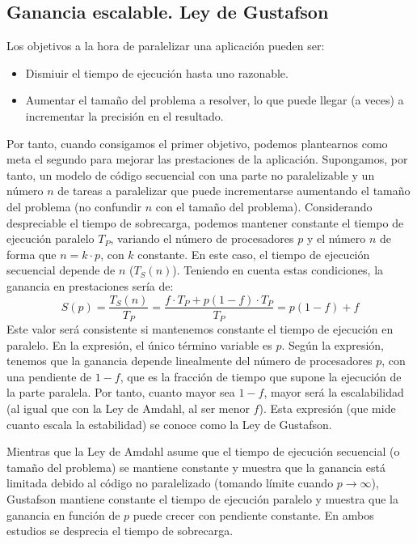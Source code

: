 \subsection{Ganancia escalable. Ley de Gustafson}
Los objetivos a la hora de paralelizar una aplicación pueden ser:
\begin{itemize}
    \item Dismiuir el tiempo de ejecución hasta uno razonable.
    \item Aumentar el tamaño del problema a resolver, lo que puede llegar (a veces) a incrementar la precisión en el resultado.
\end{itemize}

Por tanto, cuando consigamos el primer objetivo, podemos plantearnos como meta el segundo para mejorar las prestaciones de la aplicación. Supongamos, por tanto, un modelo de código secuencial con una parte no paralelizable y un número $n$ de tareas a paralelizar que puede incrementarse aumentando el tamaño del problema (no confundir $n$ con el tamaño del problema). Considerando despreciable el tiempo de sobrecarga, podemos mantener constante el tiempo de ejecución paralelo $T_P$, variando el número de procesadores $p$ y el número $n$ de forma que $n=k\cdot p$, con $k$ constante. En este caso, el tiempo de ejecución secuencial depende de $n$ ($T_S(n)$). Teniendo en cuenta estas condiciones, la ganancia en prestaciones sería de:
\begin{equation}
    S(p) = \dfrac{T_S(n)}{T_P} = \dfrac{f\cdot T_P + p(1-f)\cdot T_P}{T_P} = p(1-f)+f
\end{equation}
Este valor será consistente si mantenemos constante el tiempo de ejecución en paralelo. En la expresión, el único término variable es $p$. Según la expresión, tenemos que la ganancia depende linealmente del número de procesadores $p$, con una pendiente de $1-f$, que es la fracción de tiempo que supone la ejecución de la parte paralela. Por tanto, cuanto mayor sea $1-f$, mayor será la escalabilidad (al igual que con la Ley de Amdahl, al ser menor $f$). Esta expresión (que mide cuanto escala la estabilidad) se conoce como la Ley de Gustafson.

Mientras que la Ley de Amdahl asume que el tiempo de ejecución secuencial (o tamaño del problema) se mantiene constante y muestra que la ganancia está limitada debido al código no paralelizado (tomando límite cuando $p\to\infty$), Gustafson mantiene constante el tiempo de ejecución paralelo y muestra que la ganancia en función de $p$ puede crecer con pendiente constante. En ambos estudios se desprecia el tiempo de sobrecarga.

